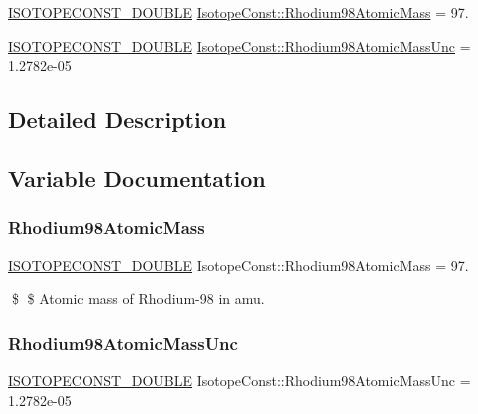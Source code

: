 \begin{DoxyCompactItemize}
\item 
\mbox{\hyperlink{group___isotope_const-_macros_ga8f45a7272ce02c0b4c65c44636ed719a}{I\+S\+O\+T\+O\+P\+E\+C\+O\+N\+S\+T\+\_\+\+D\+O\+U\+B\+LE}} \mbox{\hyperlink{group___isotope_const-_rhodium-_rh98_gae65a8c647ec5528fb3787f120cacd0ba}{Isotope\+Const\+::\+Rhodium98\+Atomic\+Mass}} = 97.
\item 
\mbox{\hyperlink{group___isotope_const-_macros_ga8f45a7272ce02c0b4c65c44636ed719a}{I\+S\+O\+T\+O\+P\+E\+C\+O\+N\+S\+T\+\_\+\+D\+O\+U\+B\+LE}} \mbox{\hyperlink{group___isotope_const-_rhodium-_rh98_ga23bd7d3d213ccd542a1806aa71ca3948}{Isotope\+Const\+::\+Rhodium98\+Atomic\+Mass\+Unc}} = 1.\+2782e-\/05
\end{DoxyCompactItemize}


\subsection{Detailed Description}


\subsection{Variable Documentation}
\mbox{\label{group___isotope_const-_rhodium-_rh98_gae65a8c647ec5528fb3787f120cacd0ba}} 
\subsubsection{\texorpdfstring{Rhodium98\+Atomic\+Mass}{Rhodium98AtomicMass}}
{\footnotesize\ttfamily \mbox{\hyperlink{group___isotope_const-_macros_ga8f45a7272ce02c0b4c65c44636ed719a}{I\+S\+O\+T\+O\+P\+E\+C\+O\+N\+S\+T\+\_\+\+D\+O\+U\+B\+LE}} Isotope\+Const\+::\+Rhodium98\+Atomic\+Mass = 97.}

\$ \$ Atomic mass of Rhodium-\/98 in amu. \mbox{\label{group___isotope_const-_rhodium-_rh98_ga23bd7d3d213ccd542a1806aa71ca3948}} 
\subsubsection{\texorpdfstring{Rhodium98\+Atomic\+Mass\+Unc}{Rhodium98AtomicMassUnc}}
{\footnotesize\ttfamily \mbox{\hyperlink{group___isotope_const-_macros_ga8f45a7272ce02c0b4c65c44636ed719a}{I\+S\+O\+T\+O\+P\+E\+C\+O\+N\+S\+T\+\_\+\+D\+O\+U\+B\+LE}} Isotope\+Const\+::\+Rhodium98\+Atomic\+Mass\+Unc = 1.\+2782e-\/05}


